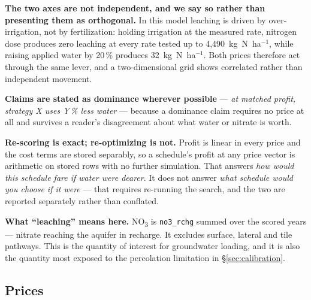 \documentclass[a4paper,fleqn]{cas-sc}
\begin{document}
\textbf{The two axes are not independent, and we say so rather than presenting them as
orthogonal.} In this model leaching is driven by over-irrigation, not by fertilization:
holding irrigation at the measured rate, nitrogen dose produces zero leaching at every
rate tested up to 4{,}490~kg~N~ha$^{-1}$, while raising applied water by 20\,\% produces
32~kg~N~ha$^{-1}$. Both prices therefore act through the same lever, and a
two-dimensional grid shows correlated rather than independent movement.

\textbf{Claims are stated as dominance wherever possible} --- \emph{at matched profit,
strategy X uses Y\,\% less water} --- because a dominance claim requires no price at all
and survives a reader's disagreement about what water or nitrate is worth.

\textbf{Re-scoring is exact; re-optimizing is not.} Profit is linear in every price and
the cost terms are stored separably, so a schedule's profit at any price vector is
arithmetic on stored rows with no further simulation. That answers \emph{how would this
schedule fare if water were dearer}. It does not answer \emph{what schedule would you
choose if it were} --- that requires re-running the search, and the two are reported
separately rather than conflated.

\textbf{What ``leaching'' means here.} NO\textsubscript{3} is \texttt{no3\_rchg} summed
over the scored years --- nitrate reaching the aquifer in recharge. It excludes surface,
lateral and tile pathways. This is the quantity of interest for groundwater loading, and
it is also the quantity most exposed to the percolation limitation in
\S\ref{sec:calibration}.

\subsection{Prices}\label{sec:prices}
\end{document}
